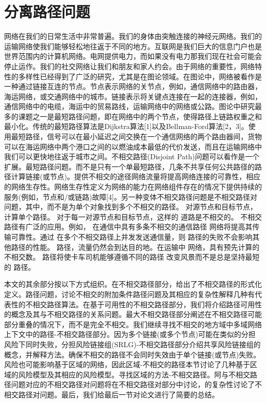 \chapter{分离路径问题}
网络在我们的日常生活中非常普遍。我们的身体由突触连接的神经元网络。我们的运输网络使我们能够轻松地往返于不同的地方。互联网是我们巨大的信息门户也是世界范围内的计算机网络。电网提供电力，而如果没有电力那我们现在社会可能会停止运作。我们的社交网络让我们和朋友和家人约会。由于网络的重要性，网络特性的多样性已经得到了广泛的研究，尤其是在图论领域。在图论中，网络被看作是一种通过链接互连的节点。节点表示网络的关节点，例如，通信网络中的路由器，海运网络，或交通网络中的城市。链接表示将关键点连接在一起的连接器，例如，通信网络中的电缆，海运中的贸易路线，运输网络中的网络或公路。图论中研究最多的课题之一是最短路径问题，即在网络中的两个节点，使得路径上链路权重之和最小化。传统的最短路径算法是Dijkstra算法[1]以及Bellman-Ford算法[2，3]。使用最短路径，信号可以在最小延迟之间交换在一个通信网络的两个路由器间，货物可以在海运网络中两个港口之间的以燃油成本最低的代价发送，而且在运输网络中我们可以更快地往返于城市之间。不相交路径(Disjoint Path)问题可以看作是一个扩展。最短路径问题。而不是只有一个单最短路径，几条不共享任何公共路径的路径计算链接(或节点)。提供不相交的途径网络流量将提高网络连接的可靠性，相应的网络生存性。网络生存性定义为网络的能力在网络组件存在的情况下提供持续的服务(例如，节点和/或链路)故障[4]。另一种变体不相交路径问题是不相交路径对问题，其中，而不是为单个对象找到多个不相交的路径。
对源节点和目标节点，计算单个路径。
对于每一对源节点和目标节点，这样的
道路是不相交的。
不相交路径有广泛的应用。例如，
在通信中具有多条不相交的通信路径
网络将提高其传输可靠性。通过
在多个不相交路径上并发发送通信量，则
路径的失败不会影响其他路径的性能。
路径，流量仍然会到达目的地。在运输中
网络，具有预先计算的不相交数。
路径将使卡车司机能够遵循不同的路径
改变风景而不是总是坚持最短的
路径。


本文的其余部分按以下方式组织。在不相交路径部分，给出了不相交路径的形式化定义。路径问题，讨论不相交的附加条件路径问题及其相应的复杂性解释几种有代表性的不相交路径算法。在基于可用性的不相交路径部分，我们将介绍路径可用性的概念及其与不相交路径的关系问题。最大不相交路径部分阐述在不相交路径可能部分重叠的情况下，而不是完全不相交。我们继续寻找不相交的地方域中多域网络上下文中的路径-不相交路径部分。因为多个链接(或多个节点)可能在类似的分担风险下同时失败，分担风险链接组(SRLG)-不相交路径部分介绍共享风险链接组的概念，并解释方法。确保不相交的路径不会同时失效由于单个链接(或节点)失败。风险也可能影响基于区域的网络，因此区域-不相交的路径本节讨论了几种基于区域的风险模型及其相应的风险模型。寻找区域的方法-不相交路径。阿与不相交路径问题对应的不相交路径对问题将在不相交路径对部分中讨论，的复杂性讨论了不相交路径对问题。最后，我们给最后一节对论文进行了简要的总结。
